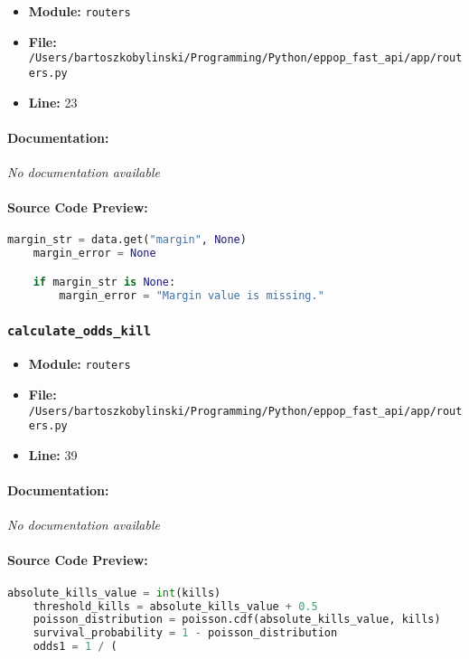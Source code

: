 \documentclass[11pt,a4paper]{article}
\begin{document}
\begin{itemize}
    \item \textbf{Module:} \texttt{routers}
    \item \textbf{File:} \texttt{/Users/bartoszkobylinski/Programming/Python/eppop\_fast\_api/app/routers.py}
    \item \textbf{Line:} 23
\end{itemize}

\paragraph{Documentation:} \textit{No documentation available}

\paragraph{Source Code Preview:}
\begin{lstlisting}[language=Python]
    margin_str = data.get("margin", None)
    margin_error = None

    if margin_str is None:
        margin_error = "Margin value is missing."
\end{lstlisting}

\vspace{1em}
\subsubsection{\texttt{calculate\_odds\_kill}}

\begin{itemize}
    \item \textbf{Module:} \texttt{routers}
    \item \textbf{File:} \texttt{/Users/bartoszkobylinski/Programming/Python/eppop\_fast\_api/app/routers.py}
    \item \textbf{Line:} 39
\end{itemize}

\paragraph{Documentation:} \textit{No documentation available}

\paragraph{Source Code Preview:}
\begin{lstlisting}[language=Python]
    absolute_kills_value = int(kills)
    threshold_kills = absolute_kills_value + 0.5
    poisson_distribution = poisson.cdf(absolute_kills_value, kills)
    survival_probability = 1 - poisson_distribution
    odds1 = 1 / (
\end{lstlisting}
\end{document}
